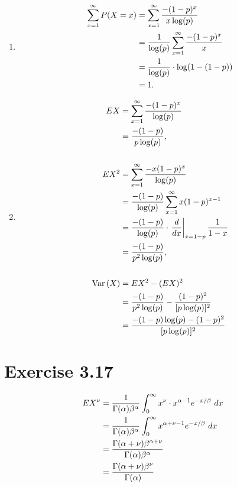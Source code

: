 \documentclass[12pt,letterpaper,reqno]{amsart}
\numberwithin{equation}{subsection}
\begin{document}
\begin{enumerate}[label=(\alph*),leftmargin=*]
    \item
    
    \begin{align*}
        \sum_{x=1}^{\infty} \fun{P}{X = x}
        &= \sum_{x=1}^{\infty} \frac{-(1-p)^x}{x\log(p)} \\
        &= \frac{1}{\log(p)} \sum_{x=1}^{\infty} \frac{-(1-p)^x}{x} \\
        &= \frac{1}{\log(p)} \cdot \log(1-(1-p)) \\
        &= 1.
    \end{align*}
    
    \item
    
    \begin{align*}
        EX &= \sum_{x = 1}^{\infty} \frac{-(1-p)^x}{\log(p)} \\
           &= \frac{-(1-p)}{p\log(p)}, \\
           \\
        EX^2 &= \sum_{x=1}^{\infty} \frac{-x(1-p)^x}{\log(p)} \\
        &= \frac{-(1-p)}{\log(p)} \sum_{x = 1}^{\infty} x(1-p)^{x-1} \\
        &= \frac{-(1-p)}{\log(p)} \cdot \left.\Dif{}{x}\right\vert_{x = 1-p} \frac{1}{1-x} \\
        &= \frac{-(1-p)}{p^2 \log(p)}, \\
        \\
        \Var{X} &= EX^2 - (EX)^2 \\
                &= \frac{-(1-p)}{p^2 \log(p)} - \frac{(1-p)^2}{[p \log(p)]^2} \\
                &= \frac{-(1-p)\log(p)-(1-p)^2}{[p \log(p)]^2}
    \end{align*}
\end{enumerate}

\newpage
\section{Exercise 3.17}

\begin{align*}
    EX^{\nu} &= \frac{1}{\Gamma(\alpha) \beta^{\alpha}} \myint{x^{\nu} \cdot x^{\alpha - 1} e^{-x/\beta}}{x}{0}{\infty} \\
    &= \frac{1}{\Gamma(\alpha) \beta^{\alpha}} \myint{x^{\alpha + \nu - 1} e^{-x/\beta}}{x}{0}{\infty} \\
    &= \frac{\Gamma(\alpha + \nu) \beta^{\alpha + \nu}}{\Gamma(\alpha) \beta^{\alpha}} \\
    &=  \frac{\Gamma(\alpha + \nu) \beta^{\nu}}{\Gamma(\alpha)}
\end{align*}

\newpage
\nocite{*}
\printbibliography
\end{document}
